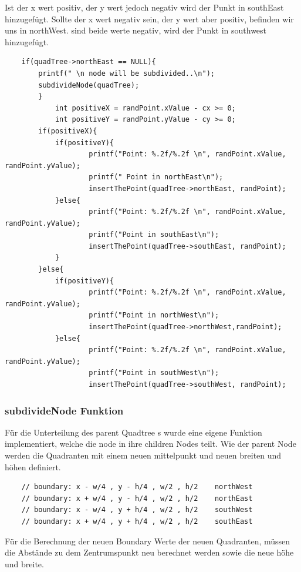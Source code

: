 \documentclass[11pt]{article}
\newcommand{\qt}{Quadtree }
\begin{document}
Ist der x wert positiv, der y wert jedoch negativ wird der Punkt in southEast hinzugefügt. Sollte der x wert negativ sein, der y wert aber positiv, befinden wir uns in northWest. sind beide werte negativ, wird der Punkt in southwest hinzugefügt.  
\begin{lstlisting}
    if(quadTree->northEast == NULL){
        printf(" \n node will be subdivided..\n");
        subdivideNode(quadTree);
        }
            int positiveX = randPoint.xValue - cx >= 0; 
            int positiveY = randPoint.yValue - cy >= 0; 
        if(positiveX){
            if(positiveY){
                    printf("Point: %.2f/%.2f \n", randPoint.xValue, randPoint.yValue);
                    printf(" Point in northEast\n");
                    insertThePoint(quadTree->northEast, randPoint);
            }else{
                    printf("Point: %.2f/%.2f \n", randPoint.xValue, randPoint.yValue);
                    printf("Point in southEast\n");
                    insertThePoint(quadTree->southEast, randPoint);
            }
        }else{
            if(positiveY){
                    printf("Point: %.2f/%.2f \n", randPoint.xValue, randPoint.yValue);
                    printf("Point in northWest\n");
                    insertThePoint(quadTree->northWest,randPoint);
            }else{
                    printf("Point: %.2f/%.2f \n", randPoint.xValue, randPoint.yValue);
                    printf("Point in southWest\n");
                    insertThePoint(quadTree->southWest, randPoint);
\end{lstlisting}


\subsubsection{subdivideNode Funktion}
Für die Unterteilung des parent \qt s wurde eine eigene Funktion implementiert, welche die node in ihre children Nodes teilt. Wie der parent Node werden die Quadranten mit einem neuen mittelpunkt und neuen breiten und höhen definiert.
\begin{lstlisting}
    // boundary: x - w/4 , y - h/4 , w/2 , h/2    northWest
    // boundary: x + w/4 , y - h/4 , w/2 , h/2    northEast
    // boundary: x - w/4 , y + h/4 , w/2 , h/2    southWest
    // boundary: x + w/4 , y + h/4 , w/2 , h/2    southEast
\end{lstlisting}
Für die Berechnung der neuen Boundary Werte der neuen Quadranten, müssen die Abstände zu dem Zentrumspunkt neu berechnet werden sowie die neue höhe und breite. 
\end{document}
